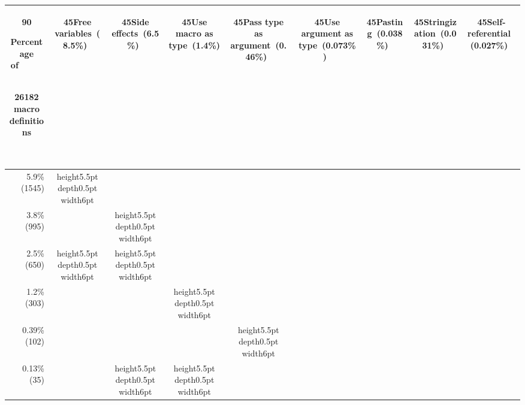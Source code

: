 
\newcommand{\black}{\vrule height5.5pt depth0.5pt width6pt}
{\footnotesize
\addtolength{\tabcolsep}{-.3\tabcolsep}
\begin{tabular}{|r|*{8}{c|}}
\multicolumn{1}{c}{\begin{rotate}{90}{\parbox{1in}{Percentage of~~~~~\strut \\ 26182 macro \\ definitions}~}\end{rotate}} &
\multicolumn{1}{c}{\begin{rotate}{45}{Free variables~(8.5\%)~}\end{rotate}} &
\multicolumn{1}{c}{\begin{rotate}{45}{Side effects~(6.5\%)~}\end{rotate}} &
\multicolumn{1}{c}{\begin{rotate}{45}{Use macro as type~(1.4\%)~}\end{rotate}} &
\multicolumn{1}{c}{\begin{rotate}{45}{Pass type as argument~(0.46\%)~}\end{rotate}} &
\multicolumn{1}{c}{\begin{rotate}{45}{Use argument as type~(0.073\%)~}\end{rotate}} &
\multicolumn{1}{c}{\begin{rotate}{45}{Pasting~(0.038\%)~}\end{rotate}} &
\multicolumn{1}{c}{\begin{rotate}{45}{Stringization~(0.031\%)~}\end{rotate}} &
\multicolumn{1}{c}{\begin{rotate}{45}{Self-referential~(0.027\%)~}\end{rotate}}
\\ \hline
5.9\% (1545)&\black& & & & & & & \\ \hline
3.8\% (995)& &\black& & & & & & \\ \hline
2.5\% (650)&\black&\black& & & & & & \\ \hline
1.2\% (303)& & &\black& & & & & \\ \hline
0.39\% (102)& & & &\black& & & & \\ \hline
0.13\% (35)& &\black&\black& & & & & \\ \hline

\end{tabular}}
